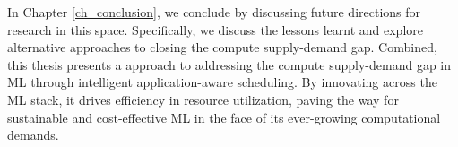 In Chapter \ref{ch_conclusion}, we conclude by discussing future directions for research in this space. Specifically, we discuss the lessons learnt and explore alternative approaches to closing the compute supply-demand gap. Combined, this thesis presents a approach to addressing the compute supply-demand gap in ML through intelligent application-aware scheduling. By innovating across the ML stack, it drives efficiency in resource utilization, paving the way for sustainable and cost-effective ML in the face of its ever-growing computational demands.







